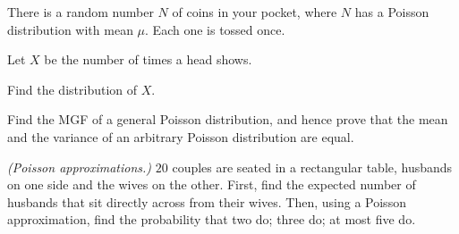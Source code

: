 \begin{problem}[Handout 10, \# 12]
  There is a random number \(N\) of coins in your pocket, where \(N\) has a
  Poisson distribution with mean \(\mu\). Each one is tossed once.

  \noindent Let \(X\) be the number of times a head shows.

  \noindent Find the distribution of \(X\).
\end{problem}
\begin{solution}

\end{solution}
\newpage

\begin{problem}[Handout 10, \# 14]
  Find the MGF of a general Poisson distribution, and hence prove that the
  mean and the variance of an arbitrary Poisson distribution are equal.
\end{problem}
\begin{solution}

\end{solution}
\newpage

\begin{problem}[Handout 10, \# 17 (a)]
  \emph{(Poisson approximations.)} \(20\) couples are seated in a
  rectangular table, husbands on one side and the wives on the
  other. First, find the expected number of husbands that sit directly
  across from their wives. Then, using a Poisson approximation, find the
  probability that two do; three do; at most five do.
\end{problem}
\begin{solution}

\end{solution}

